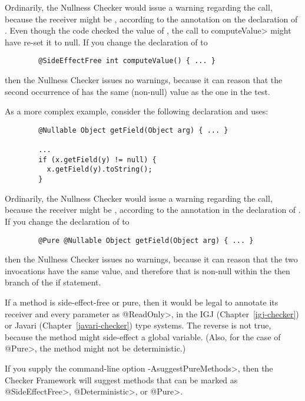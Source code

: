 \noindent
Ordinarily, the Nullness Checker would issue a warning regarding the
 call, because the receiver  might be
, according to the  annotation on the
declaration of .  Even though the code checked the value of
, the call to \<computeValue> might have re-set it to null.
If you change the declaration of  to

\begin{Verbatim}
        @SideEffectFree int computeValue() { ... }
\end{Verbatim}

\noindent
then the Nullness Checker issues no warnings, because it can reason that
the second occurrence of  has the same (non-null) value as
the one in the test.

As a more complex example, consider the
following declaration and uses:

\begin{Verbatim}
        @Nullable Object getField(Object arg) { ... }

        ...
        if (x.getField(y) != null) {
          x.getField(y).toString();
        }
\end{Verbatim}

Ordinarily, the Nullness Checker would issue a warning regarding the
 call, because the receiver  might
be , according to the  annotation in the
declaration of .  If you change the declaration of
 to

\begin{Verbatim}
        @Pure @Nullable Object getField(Object arg) { ... }
\end{Verbatim}

\noindent
then the Nullness Checker issues no warnings, because it can reason that
the two invocations  have the same value, and
therefore that  is non-null within the then branch
of the if statement.


If a method is side-effect-free or pure, then it would be legal to annotate its receiver and
every parameter as \<@ReadOnly>, in the IGJ (Chapter~\ref{igj-checker}) or
Javari (Chapter~\ref{javari-checker}) type systems.  The reverse is not
true, because the method might side-effect a global variable.  (Also, for
the case of \<@Pure>, the method might not be deterministic.)

If you supply the command-line option \<-AsuggestPureMethods>, then the
Checker Framework will suggest methods that can be marked as
\<@SideEffectFree>, \<@Deterministic>, or \<@Pure>.


